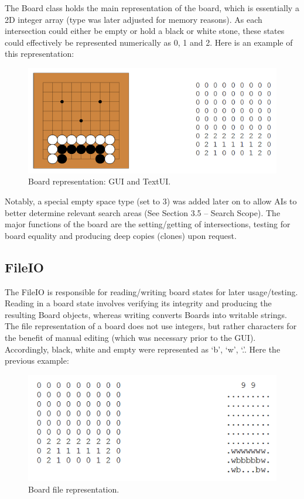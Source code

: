 \documentclass{l3proj}
\begin{document}
The Board class holds the main representation of the board, which is essentially a 2D integer array (type was later adjusted for memory reasons). As each intersection could either be empty or hold a black or white stone, these states could effectively be represented numerically as 0, 1 and 2. Here is an example of this representation:

\begin{figure}[H]
\centering
\includegraphics[scale=1]{Images/GE-BoardRep.png}
\caption{Board representation: GUI and TextUI.}
\end{figure}

Notably, a special empty space type (set to 3) was added later on to allow AIs to better determine relevant search areas (See Section 3.5 – Search Scope). The major functions of the board are the setting/getting of intersections, testing for board equality and producing deep copies (clones) upon request. 

\subsection{FileIO}

The FileIO is responsible for reading/writing board states for later usage/testing. Reading in a board state involves verifying its integrity and producing the resulting Board objects, whereas writing converts Boards into writable strings. The file representation of a board does not use integers, but rather characters for the benefit of manual editing (which was necessary prior to the GUI). Accordingly, black, white and empty were represented as ‘b’, ‘w’, ‘.’. Here the previous example:

\begin{figure}[H]
\centering
\includegraphics[scale=1]{Images/GE-BoardSave.png}
\caption{Board file representation.}
\end{figure}
\end{document}
